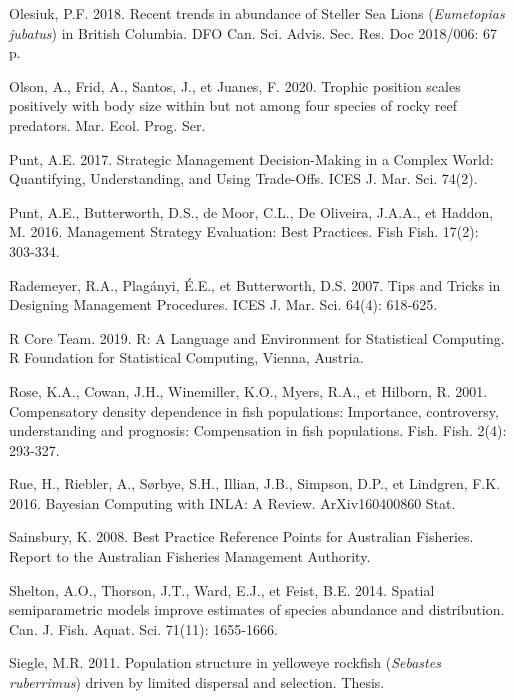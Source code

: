 \documentclass[french,11pt]{book}
\begin{document}
\leavevmode\hypertarget{ref-olesiuk2018}{}%
Olesiuk, P.F. 2018. Recent trends in abundance of Steller Sea Lions (\emph{Eumetopias jubatus}) in British Columbia. DFO Can. Sci. Advis. Sec. Res. Doc 2018/006: 67 p.

\leavevmode\hypertarget{ref-olson2020}{}%
Olson, A., Frid, A., Santos, J., et Juanes, F. 2020. Trophic position scales positively with body size within but not among four species of rocky reef predators. Mar. Ecol. Prog. Ser.

\leavevmode\hypertarget{ref-punt2017}{}%
Punt, A.E. 2017. Strategic Management Decision-Making in a Complex World: Quantifying, Understanding, and Using Trade-Offs. ICES J. Mar. Sci. 74(2).

\leavevmode\hypertarget{ref-punt2016}{}%
Punt, A.E., Butterworth, D.S., de Moor, C.L., De Oliveira, J.A.A., et Haddon, M. 2016. Management Strategy Evaluation: Best Practices. Fish Fish. 17(2): 303‑334.

\leavevmode\hypertarget{ref-rademeyer2007}{}%
Rademeyer, R.A., Plagányi, É.E., et Butterworth, D.S. 2007. Tips and Tricks in Designing Management Procedures. ICES J. Mar. Sci. 64(4): 618‑625.

\leavevmode\hypertarget{ref-r2019}{}%
R Core Team. 2019. R: A Language and Environment for Statistical Computing. R Foundation for Statistical Computing, Vienna, Austria.

\leavevmode\hypertarget{ref-rose2001}{}%
Rose, K.A., Cowan, J.H., Winemiller, K.O., Myers, R.A., et Hilborn, R. 2001. Compensatory density dependence in fish populations: Importance, controversy, understanding and prognosis: Compensation in fish populations. Fish. Fish. 2(4): 293‑327.

\leavevmode\hypertarget{ref-rue2016}{}%
Rue, H., Riebler, A., Sørbye, S.H., Illian, J.B., Simpson, D.P., et Lindgren, F.K. 2016. Bayesian Computing with INLA: A Review. ArXiv160400860 Stat.

\leavevmode\hypertarget{ref-sainsbury2008}{}%
Sainsbury, K. 2008. Best Practice Reference Points for Australian Fisheries. Report to the Australian Fisheries Management Authority.

\leavevmode\hypertarget{ref-shelton2014}{}%
Shelton, A.O., Thorson, J.T., Ward, E.J., et Feist, B.E. 2014. Spatial semiparametric models improve estimates of species abundance and distribution. Can. J. Fish. Aquat. Sci. 71(11): 1655‑1666.

\leavevmode\hypertarget{ref-siegle2011}{}%
Siegle, M.R. 2011. Population structure in yelloweye rockfish (\emph{Sebastes ruberrimus}) driven by limited dispersal and selection. Thesis.
\end{document}
